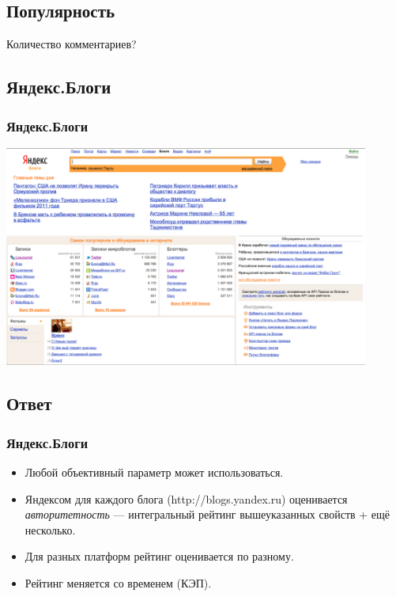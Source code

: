 \documentclass[compress,red]{beamer}
\begin{document}
\subsection{Популярность}
\begin{frame}
	\begin{center}
	\Large{Количество комментариев?}
	\end{center}
\end{frame}

\subsection{Яндекс.Блоги}
\begin{frame}
  \frametitle{Яндекс.Блоги}
	\centerline{\includegraphics[width=0.9\textwidth]{images/blogs-yandex.png}}
\end{frame}

\subsection{Ответ}
\begin{frame}
  \frametitle{Яндекс.Блоги}
	\begin{itemize}
		\item Любой объективный параметр может использоваться.
		\item Яндексом для каждого блога (http://blogs.yandex.ru) оценивается \emph{авторитетность} --- интегральный рейтинг вышеуказанных свойств + ещё несколько.
		\item Для разных платформ рейтинг оценивается по разному.
		\item Рейтинг меняется со временем (КЭП).
	\end{itemize}
\end{frame}
\end{document}
